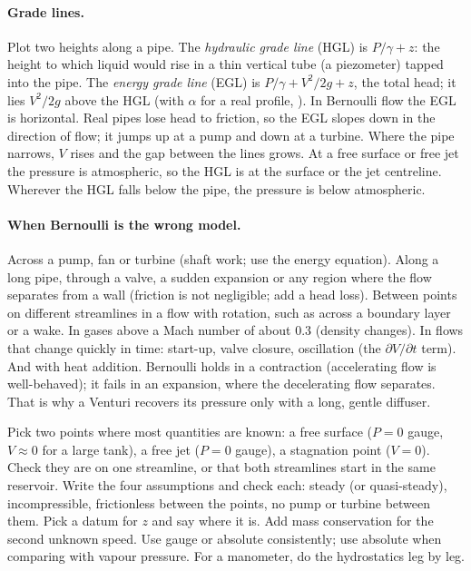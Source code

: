 \paragraph{Grade lines.} Plot two heights along a pipe. The \emph{hydraulic grade line} (HGL) is $P/\gamma + z$: the height to which liquid would rise in a thin vertical tube (a piezometer) tapped into the pipe. The \emph{energy grade line} (EGL) is $P/\gamma + V^2/2g + z$, the total head; it lies $V^2/2g$ above the HGL (with $\alpha$ for a real profile, ). In Bernoulli flow the EGL is horizontal. Real pipes lose head to friction, so the EGL slopes down in the direction of flow; it jumps up at a pump and down at a turbine. Where the pipe narrows, $V$ rises and the gap between the lines grows. At a free surface or free jet the pressure is atmospheric, so the HGL is at the surface or the jet centreline. Wherever the HGL falls below the pipe, the pressure is below atmospheric.

\paragraph{When Bernoulli is the wrong model.} Across a pump, fan or turbine (shaft work; use the energy equation). Along a long pipe, through a valve, a sudden expansion or any region where the flow separates from a wall (friction is not negligible; add a head loss). Between points on different streamlines in a flow with rotation, such as across a boundary layer or a wake. In gases above a Mach number of about $0.3$ (density changes). In flows that change quickly in time: start-up, valve closure, oscillation (the $\partial V/\partial t$ term). And with heat addition. Bernoulli holds in a contraction (accelerating flow is well-behaved); it fails in an expansion, where the decelerating flow separates. That is why a Venturi recovers its pressure only with a long, gentle diffuser.

\begin{firstmoves}
Pick two points where most quantities are known: a free surface ($P = 0$ gauge, $V \approx 0$ for a large tank), a free jet ($P = 0$ gauge), a stagnation point ($V = 0$). Check they are on one streamline, or that both streamlines start in the same reservoir. Write the four assumptions and check each: steady (or quasi-steady), incompressible, frictionless between the points, no pump or turbine between them. Pick a datum for $z$ and say where it is. Add mass conservation for the second unknown speed. Use gauge or absolute consistently; use absolute when comparing with vapour pressure. For a manometer, do the hydrostatics leg by leg.
\end{firstmoves}


